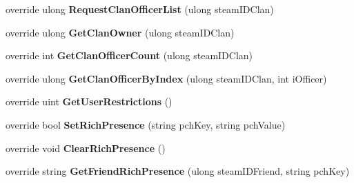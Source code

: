 \begin{DoxyCompactItemize}
\item 
\mbox{\label{class_valve_1_1_steamworks_1_1_c_steam_friends_af5b99aef7c4a878549ba4b5702faa779}} 
override ulong {\bfseries Request\+Clan\+Officer\+List} (ulong steam\+I\+D\+Clan)
\item 
\mbox{\label{class_valve_1_1_steamworks_1_1_c_steam_friends_a17864a093a9d03ebfce523a2fa563708}} 
override ulong {\bfseries Get\+Clan\+Owner} (ulong steam\+I\+D\+Clan)
\item 
\mbox{\label{class_valve_1_1_steamworks_1_1_c_steam_friends_a6f908cad7fb0e28f781df2009bff79ef}} 
override int {\bfseries Get\+Clan\+Officer\+Count} (ulong steam\+I\+D\+Clan)
\item 
\mbox{\label{class_valve_1_1_steamworks_1_1_c_steam_friends_a990f120e2b232e9726df1440c95ad1c4}} 
override ulong {\bfseries Get\+Clan\+Officer\+By\+Index} (ulong steam\+I\+D\+Clan, int i\+Officer)
\item 
\mbox{\label{class_valve_1_1_steamworks_1_1_c_steam_friends_ab3fe6cef1b869960151bf88129366d58}} 
override uint {\bfseries Get\+User\+Restrictions} ()
\item 
\mbox{\label{class_valve_1_1_steamworks_1_1_c_steam_friends_ab4ef24b7e5d16fd22842aaefc62f8af2}} 
override bool {\bfseries Set\+Rich\+Presence} (string pch\+Key, string pch\+Value)
\item 
\mbox{\label{class_valve_1_1_steamworks_1_1_c_steam_friends_a4c63d6bccfee7c33518f8f441ea8d5ec}} 
override void {\bfseries Clear\+Rich\+Presence} ()
\item 
\mbox{\label{class_valve_1_1_steamworks_1_1_c_steam_friends_a4ddac1901d98e58ad9c04d570d5ae3ec}} 
override string {\bfseries Get\+Friend\+Rich\+Presence} (ulong steam\+I\+D\+Friend, string pch\+Key)
\item 
\mbox{\label{class_valve_1_1_steamworks_1_1_c_steam_friends_a7c09e8defbacf997a5262135a4e3a1a1}} 

\end{DoxyCompactItemize}
